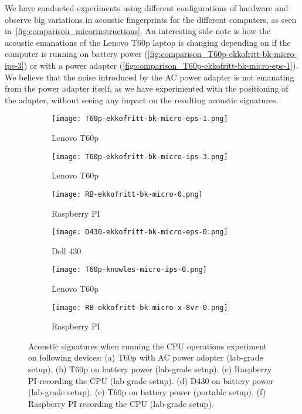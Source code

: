 We have conducted experiments using different configurations of hardware and observe big variations in acoustic fingerprints for the different computers, as seen in~\autoref{fig:comparison_micorinstructions}.
An interesting side note is how the acoustic emanations of the Lenovo T60p laptop is changing depending on if the computer is running on battery power (\autoref{fig:comparison_T60p-ekkofritt-bk-micro-ips-3}) or with a power adapter (\autoref{fig:comparison_T60p-ekkofritt-bk-micro-eps-1}).
We believe that the noise introduced by the \gls{AC} power adapter is not emanating from the power adapter itself, as we have experimented with the positioning of the adapter, without seeing any impact on the resulting acoustic signatures.

\begin{figure}[ht]
    \centering
    \begin{subfigure}{0.32\textwidth}
        \centering
        \texttt{[image: T60p-ekkofritt-bk-micro-eps-1.png]}
        \caption{Lenovo T60p}
        \label{fig:comparison_T60p-ekkofritt-bk-micro-eps-1}
    \end{subfigure}
    \begin{subfigure}{0.32\textwidth}
        \centering
        \texttt{[image: T60p-ekkofritt-bk-micro-ips-3.png]}
        \caption{Lenovo T60p}
        \label{fig:comparison_T60p-ekkofritt-bk-micro-ips-3}
    \end{subfigure}
    \begin{subfigure}{0.32\textwidth}
        \centering
        \texttt{[image: RB-ekkofritt-bk-micro-0.png]}
        \caption{Raspberry PI}
        \label{fig:comparison_RB-ekkofritt-bk-micro-0}
    \end{subfigure}
    \begin{subfigure}{0.32\textwidth}
        \centering
        \texttt{[image: D430-ekkofritt-bk-micro-eps-0.png]}
        \caption{Dell 430}
        \label{fig:comparison_D430-ekkofritt-bk-micro-eps-0}
    \end{subfigure}
    \begin{subfigure}{0.32\textwidth}
        \centering
        \texttt{[image: T60p-knowles-micro-ips-0.png]}
        \caption{Lenovo T60p}
        \label{fig:comparison_T60p-knowles-micro-ips-0}
    \end{subfigure}
    \begin{subfigure}{0.32\textwidth}
        \centering
        \texttt{[image: RB-ekkofritt-bk-micro-x-8vr-0.png]}
        \caption{Raspberry PI}
        \label{fig:comparison_RB-ekkofritt-bk-micro-x-8vr-0}
    \end{subfigure}
    \caption{ Acoustic signatures when running the CPU operations experiment on following devices:
    (a) T60p with \gls{AC} power adopter (lab-grade setup).
    (b) T60p on battery power (lab-grade setup).
    (c) Raspberry PI recording the CPU (lab-grade setup).
    (d) D430 on battery power (lab-grade setup).
    (e) T60p on battery power (portable setup).
    (f) Raspberry PI recording the CPU (lab-grade setup).}
    \label{fig:comparison_micorinstructions}
\end{figure}

